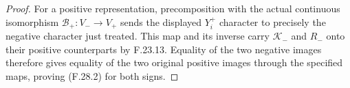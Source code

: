 \begin{proof}
For a positive representation, precomposition
with the actual continuous isomorphism
$\mathcal B_+:V_-\to V_+$ sends the displayed
$Y_i^+$ character to precisely the negative
character just treated. This map and its
inverse carry $\mathcal K_-$ and $R_-$ onto
their positive counterparts by F.23.13.
Equality of the two negative images therefore
gives equality of the two original positive
images through the specified maps, proving
(F.28.2) for both signs.
\end{proof}
